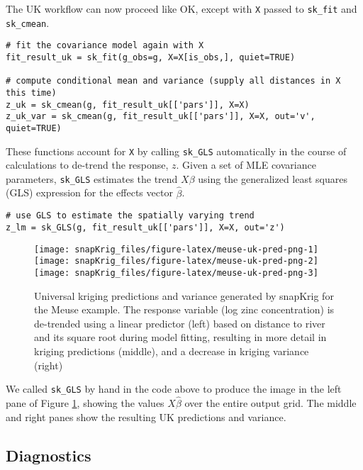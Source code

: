 The UK workflow can now proceed like OK, except with \texttt{X} passed to \texttt{sk\_fit} and \texttt{sk\_cmean}.

\begin{verbatim}
# fit the covariance model again with X
fit_result_uk = sk_fit(g_obs=g, X=X[is_obs,], quiet=TRUE)

# compute conditional mean and variance (supply all distances in X this time)
z_uk = sk_cmean(g, fit_result_uk[['pars']], X=X)
z_uk_var = sk_cmean(g, fit_result_uk[['pars']], X=X, out='v', quiet=TRUE)
\end{verbatim}

These functions account for \texttt{X} by calling \texttt{sk\_GLS} automatically in the course of calculations to de-trend the response, \(z\). Given a set of MLE covariance parameters, \texttt{sk\_GLS} estimates the trend \(X\beta\) using the generalized least squares (GLS) expression for the effects vector \(\hat{\beta}\).

\begin{verbatim}
# use GLS to estimate the spatially varying trend 
z_lm = sk_GLS(g, fit_result_uk[['pars']], X=X, out='z')
\end{verbatim}

\begin{figure}
\texttt{[image: snapKrig\_files/figure-latex/meuse-uk-pred-png-1]} \texttt{[image: snapKrig\_files/figure-latex/meuse-uk-pred-png-2]} \texttt{[image: snapKrig\_files/figure-latex/meuse-uk-pred-png-3]} \caption{Universal kriging predictions and variance generated by snapKrig for the Meuse example. The response variable (log zinc concentration) is de-trended using a linear predictor (left) based on distance to river and its square root during model fitting, resulting in more detail in kriging predictions (middle), and a decrease in kriging variance (right)}\label{fig:meuse-uk-pred-png}
\end{figure}

We called \texttt{sk\_GLS} by hand in the code above to produce the image in the left pane of Figure \ref{fig:meuse-uk-pred-png}, showing the values \(X\hat{\beta}\) over the entire output grid. The middle and right panes show the resulting UK predictions and variance.

\hypertarget{diagnostics}{%
\subsection{Diagnostics}\label{diagnostics}}

